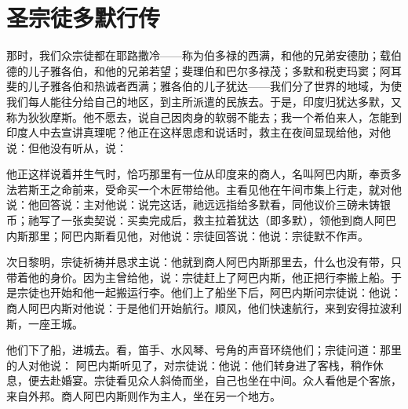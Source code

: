 
\chapter{圣宗徒多默行传}


那时，我们众宗徒都在耶路撒冷——称为伯多禄的西满，和他的兄弟安德肋；载伯德的儿子雅各伯，和他的兄弟若望；斐理伯和巴尔多禄茂；多默和税吏玛窦；阿耳斐的儿子雅各伯和热诚者西满；雅各伯的儿子犹达——我们分了世界的地域，为使我们每人能往分给自己的地区，到主所派遣的民族去。于是，印度归犹达多默，又称为狄狄摩斯。他不愿去，说自己因肉身的软弱不能去；我一个希伯来人，怎能到印度人中去宣讲真理呢？他正在这样思虑和说话时，救主在夜间显现给他，对他说：但他没有听从，说：\par

他正这样说着并生气时，恰巧那里有一位从印度来的商人，名叫阿巴内斯，奉贡多法若斯王之命前来，受命买一个木匠带给他。主看见他在午间市集上行走，就对他说：他回答说：主对他说：说完这话，祂远远指给多默看，同他议价三磅未铸银币；祂写了一张卖契说：买卖完成后，救主拉着犹达（即多默），领他到商人阿巴内斯那里；阿巴内斯看见他，对他说：宗徒回答说：他说：宗徒默不作声。\par

次日黎明，宗徒祈祷并恳求主说：他就到商人阿巴内斯那里去，什么也没有带，只带着他的身价。因为主曾给他，说：宗徒赶上了阿巴内斯，他正把行李搬上船。于是宗徒也开始和他一起搬运行李。他们上了船坐下后，阿巴内斯问宗徒说：他说：商人阿巴内斯对他说：于是他们开始航行。顺风，他们快速航行，来到安得拉波利斯，一座王城。\par

他们下了船，进城去。看，笛手、水风琴、号角的声音环绕他们；宗徒问道：那里的人对他说：  阿巴内斯听见了，对宗徒说：他说：他们转身进了客栈，稍作休息，便去赴婚宴。宗徒看见众人斜倚而坐，自己也坐在中间。众人看他是个客旅，来自外邦。商人阿巴内斯则作为主人，坐在另一个地方。\par

